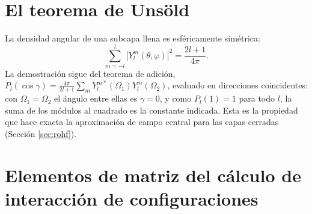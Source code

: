 \section{El teorema de Unsöld}
\label{sec:unsold}

La densidad angular de una subcapa llena es esféricamente simétrica:
\begin{equation}
    \sum_{m=-l}^{l} |Y_l^m(\theta, \varphi)|^2 = \frac{2l+1}{4\pi}.
\end{equation}
La demostración sigue del teorema de adición, $P_l(\cos \gamma) = \frac{4\pi}{2l+1} \sum_{m} Y_l^{m*}(\Omega_1) Y_l^m(\Omega_2)$, evaluado en direcciones coincidentes: con $\Omega_1 = \Omega_2$ el ángulo entre ellas es $\gamma = 0$, y como $P_l(1) = 1$ para todo $l$, la suma de los módulos al cuadrado es la constante indicada. Esta es la propiedad que hace exacta la aproximación de campo central para las capas cerradas (Sección \ref{sec:rohf}).

\section{Elementos de matriz del cálculo de interacción de configuraciones}
\label{sec:ci_racah}

